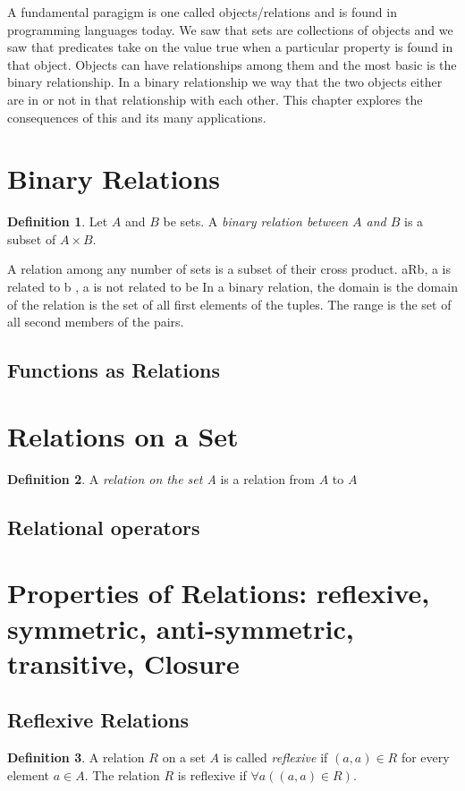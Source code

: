 \documentclass[11pt]{book} %
\theoremstyle {definition}
\newtheorem {definition}{Definition}[section]
\theoremstyle {remark}
\begin{document}
A fundamental paragigm is one called objects/relations and is found in programming languages today. We saw that sets are collections of objects and we saw that predicates take on the value true when a particular property is found in that object. Objects can have relationships among them and the most basic is the binary relationship. In a binary relationship we way that the two objects either are in or not in that relationship with each other. This chapter explores the consequences of this and its many applications.



\section {Binary Relations}
\begin {definition}
Let $A$ and $B$ be sets. A \textit {binary relation between $A$ and $B$} is a subset of $A \times B$.
\end {definition} 

A relation among any number of sets is a subset of their cross product. 
aRb, a is related to b
     , a is not related to be
In a binary relation, the domain is the domain of the relation is the set of all first elements of the tuples. The range is the set of all second members of the pairs. 

    \subsection {Functions as Relations}

\section {Relations on a Set}
\begin {definition}
A \textit{relation on the set A} is a relation from $A$ to $A$
\end {definition}

    \subsection {Relational operators}
    


\section {Properties of Relations: reflexive, symmetric, anti-symmetric, transitive, Closure}
    \subsection {Reflexive Relations}
    \begin {definition}
    A relation $R$ on a set $A$ is called \textit{reflexive} if $(a,a) \in R$ for every element $a \in A$. The relation $R$ is reflexive if $\forall a((a,a) \in R)$.
    \end {definition}
    
\end{document}

